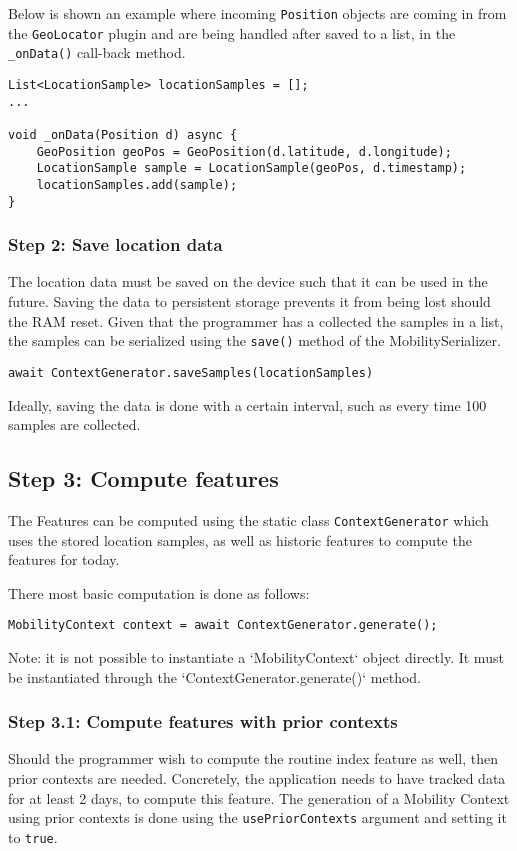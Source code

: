 Below is shown an example where incoming \verb|Position| objects are coming in from the \verb|GeoLocator| plugin and are being handled after saved to a list, in the \verb|_onData()| call-back method.

\begin{verbatim}
List<LocationSample> locationSamples = [];
...

void _onData(Position d) async {
    GeoPosition geoPos = GeoPosition(d.latitude, d.longitude);
    LocationSample sample = LocationSample(geoPos, d.timestamp);
    locationSamples.add(sample);
}
\end{verbatim}

\subsubsection*{Step 2: Save location data}
The location data must be saved on the device such that it can be used in the future. Saving the data to persistent storage prevents it from being lost should the RAM reset. Given that the programmer has a collected the samples in a list, the samples can be serialized using the \verb|save()| method of the MobilitySerializer.

\begin{verbatim}
await ContextGenerator.saveSamples(locationSamples)
\end{verbatim}

Ideally, saving the data is done with a certain interval, such as every time 100 samples are collected. 

\subsection*{Step 3: Compute features}
The Features can be computed using the static class \verb|ContextGenerator| which uses the stored location samples, as well as historic features to compute the features for today.

There most basic computation is done as follows:
\begin{verbatim}
MobilityContext context = await ContextGenerator.generate();
\end{verbatim}

Note: it is not possible to instantiate a `MobilityContext` object directly. 
It must be instantiated through the `ContextGenerator.generate()` method.

\subsubsection*{Step 3.1: Compute features with prior contexts}
Should the programmer wish to compute the routine index feature as well, then prior contexts are needed. Concretely, the application needs to have tracked data for at least 2 days, to compute this feature. The generation of a Mobility Context using prior contexts is done using the \verb|usePriorContexts| argument and setting it to \verb|true|.

